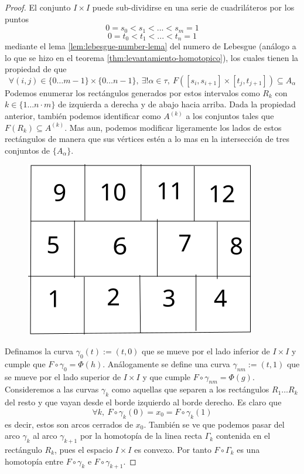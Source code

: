 \begin{proof}
  El conjunto \(I \times I\) puede sub-dividirse en una serie de
  cuadriláteros por los puntos
  \[ 0 = s_0 < s_1 < ... < s_m = 1 \]
  \[ 0 = t_0 < t_1 < ... < t_n = 1 \]
  mediante el lema \ref{lem:lebesgue-number-lema} del numero de Lebesgue
  (análogo a lo que se hizo en el teorema
  \ref{thm:levantamiento-homotopico}), los cuales tienen la propiedad de
  que
  \[ \forall (i,j) \in \{0 \dotsc m-1 \} \times \{0 \dotsc n - 1\},
    \ \exists ! \alpha \in \tau,\ F \left( [s_i, s_{i+1}] \times [t_j,
    t_{j+1}] \right) \subseteq A_\alpha \]
  Podemos enumerar los rectángulos generados por estos intervalos como
  \(R_k\) con \(k \in \{1 \dotsc n\cdot m\}\) de izquierda a derecha y
  de abajo hacia arriba. Dada la propiedad anterior, también podemos
  identificar como \( A^{(k)}\) a los conjuntos tales que \(F \left( R_k
  \right) \subseteq A^{(k)} \). Mas aun, podemos modificar ligeramente los
  lados de estos rectángulos de manera que sus vértices estén a lo mas en
  la intersección de tres conjuntos de \(\{A_\alpha\}\).
  \begin{figure}[h]
    \centering \includegraphics[scale=0.5]{./imagenes/grilla.png}
  \end{figure}

  Definamos la curva \(\gamma_0 (t) := (t, 0)\) que se mueve por el lado
  inferior de \(I \times I\) y cumple que \(F \circ \gamma_0 = \Phi (h)
  \). Análogamente se define una curva \(\gamma_{nm} := (t,1)\) que se
  mueve por el lado superior de \(I \times I\) y que cumple \(F \circ
  \gamma_{nm} = \Phi (g)\). Consideremos a las curvas \(\gamma_k\) como
  aquellas que separen a los rectángulos \(R_1 \dots R_k\) del resto y que
  vayan desde el borde izquierdo al borde derecho. Es claro que
  \[ \forall k,\ F \circ \gamma_k (0) = x_0 = F \circ \gamma_k (1) \]
  es decir, estos son arcos cerrados de \(x_0\). También se ve que
  podemos pasar del arco \(\gamma_k\) al arco \(\gamma_{k+1}\) por la
  homotopía de la linea recta \(\Gamma_k\) contenida en el rectángulo
  \(R_k\), pues el espacio \(I \times I\) es convexo. Por tanto \(F \circ
  \Gamma_k\) es una homotopía entre \(F \circ \gamma_k\) e \(F \circ
  \gamma_{k+1}\).


\end{proof}
